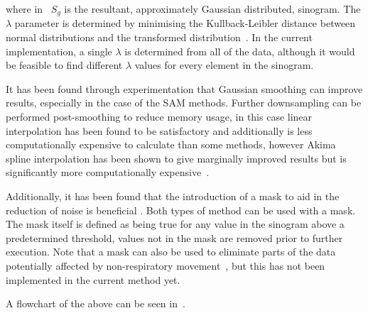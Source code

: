                 \noindent where in~ $S_g$ is the resultant, approximately Gaussian distributed, sinogram. The $\lambda$ parameter is determined by minimising the Kullback-Leibler distance between normal distributions and the transformed distribution~\parencite{Yeo2000ASymmetry}. In the current implementation, a single $\lambda$ is determined from all of the data, although it would be feasible to find different $\lambda$ values for every element in the sinogram.
                    
                It has been found through experimentation that Gaussian smoothing can improve results, especially in the case of the \gls{SAM} methods. Further downsampling can be performed post-smoothing to reduce memory usage, in this case linear interpolation has been found to be satisfactory and additionally is less computationally expensive to calculate than some methods, however Akima spline interpolation has been shown to give marginally improved results but is significantly more computationally expensive~\parencite{Akima1970AProcedures}.
                        
                Additionally, it has been found that the introduction of a mask to aid in the reduction of noise is beneficial \parencite{Thielemans2011}. Both types of method can be used with a mask. The mask itself is defined as being true for any value in the sinogram above a predetermined threshold, values not in the mask are removed prior to further execution. Note that a mask can also be used to eliminate parts of the data potentially affected by non-respiratory movement~\parencite{Bertolli2018Data-DrivenTomography}, but this has not been implemented in the current method yet.
                
                A flowchart of the above can be seen in~.
            
